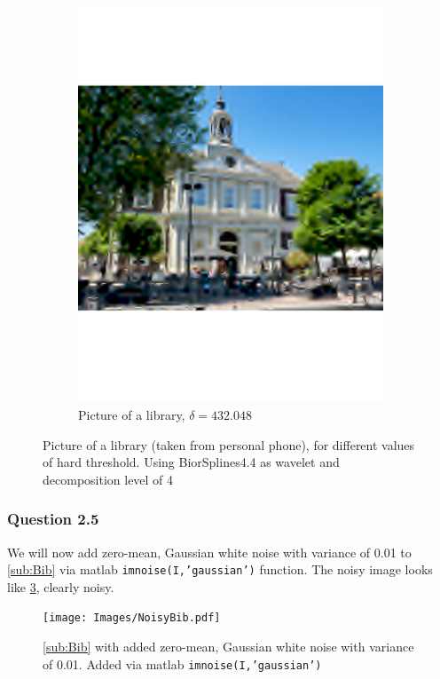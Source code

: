 \documentclass[a4paper]{article}
\begin{document}
\begin{figure}[H]
\begin{subfigure}{0.49\textwidth}
	\includegraphics[trim={4cm 8cm 4cm 8cm},clip,width=1\textwidth]{Images/BibBad.pdf}
	\caption{Picture of a library, $\delta = 432.048$}
	\label{sub:BibBad}
\end{subfigure}
	\caption{Picture of a library (taken from personal phone), for different values of hard threshold. Using BiorSplines4.4 as wavelet and decomposition level of 4}
	\label{fig:Bib}
\end{figure}

    \subsubsection{Question 2.5}

	We will now add zero-mean, Gaussian white noise with variance of 0.01 to \cref{sub:Bib} via matlab \texttt{imnoise(I,'gaussian')} function. The noisy image looks like \cref{fig:Noisy}, clearly noisy.
    \begin{figure}[H]
	\centering
	\texttt{[image: Images/NoisyBib.pdf]}
	\caption{\cref{sub:Bib} with added zero-mean, Gaussian white noise with variance of 0.01. Added via matlab \texttt{imnoise(I,'gaussian')}}
	\label{fig:Noisy}
\end{figure}
\end{document}
